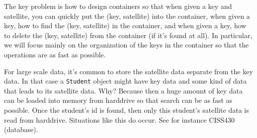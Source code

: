 The key problem is how to design containers so that
when given a key and satellite, you can quickly put the
(key, satellite) into the container,
when given a key, how to find the (key, satellite) in the container, and 
when given a key, how to delete the (key, satellite) from the container
(if it's found at all).
In particular, we will focus mainly on the organization of the keys
in the container so that the operations are as fast as possible.

For large scale data, it's common to store the satellite data
separate from the key data.
In that case a \verb!Student! object might have key data and
some kind of data that leads to its satellite data.
Why?
Because then a huge amount of key data can be loaded into memory
from harddrive so that search can be as fast as possible.
Once the student's id is found, then only this student's
satellite data is read from harddrive. 
Situations like this do occur.
See for instance CISS430 (database).
